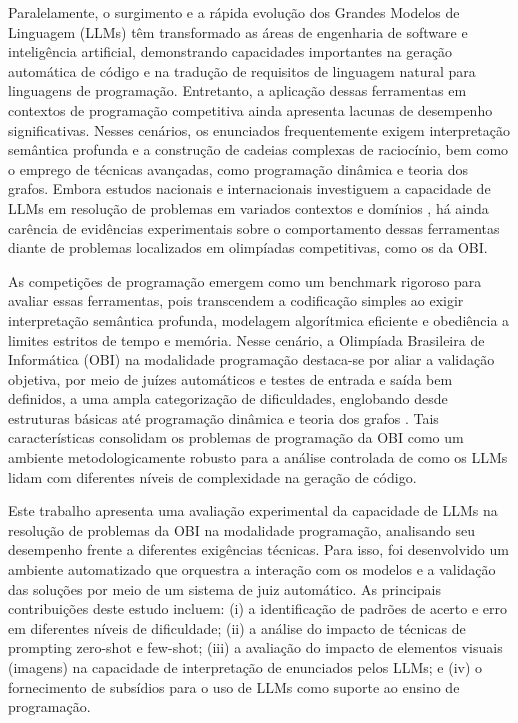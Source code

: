 \documentclass[12pt]{article}
\begin{document}
Paralelamente, o surgimento e a rápida evolução dos Grandes Modelos de Linguagem (LLMs) têm transformado as áreas de engenharia de software e inteligência artificial, demonstrando capacidades importantes na geração automática de código e na tradução de requisitos de linguagem natural para linguagens de programação. Entretanto, a aplicação dessas ferramentas em contextos de programação competitiva ainda apresenta lacunas de desempenho significativas. Nesses cenários, os enunciados frequentemente exigem interpretação semântica profunda e a construção de cadeias complexas de raciocínio, bem como o emprego de técnicas avançadas, como programação dinâmica e teoria dos grafos. Embora estudos nacionais e internacionais investiguem a capacidade de LLMs em resolução de problemas em variados contextos e domínios \cite{chen2021evaluating, mendonca2024evaluating, viegas2025assessing, huang2024competition, zheng2025livecodebench, li2024evaluating, almeida2023bluex}, há ainda carência de evidências experimentais sobre o comportamento dessas ferramentas diante de problemas localizados em olimpíadas competitivas, como os da OBI.

As competições de programação emergem como um benchmark rigoroso para avaliar essas ferramentas, pois transcendem a codificação simples ao exigir interpretação semântica profunda, modelagem algorítmica eficiente e obediência a limites estritos de tempo e memória. Nesse cenário, a Olimpíada Brasileira de Informática (OBI) na modalidade programação destaca-se por aliar a validação objetiva, por meio de juízes automáticos e testes de entrada e saída bem definidos, a uma ampla categorização de dificuldades, englobando desde estruturas básicas até programação dinâmica e teoria dos grafos \cite{obi2026}. Tais características consolidam os problemas de programação da OBI como um ambiente metodologicamente robusto para a análise controlada de como os LLMs lidam com diferentes níveis de complexidade na geração de código.

Este trabalho apresenta uma avaliação experimental da capacidade de LLMs na resolução de problemas da OBI na modalidade programação, analisando seu desempenho frente a diferentes exigências técnicas. Para isso, foi desenvolvido um ambiente automatizado que orquestra a interação com os modelos e a validação das soluções por meio de um sistema de juiz automático. As principais contribuições deste estudo incluem: (i) a identificação de padrões de acerto e erro em diferentes níveis de dificuldade; (ii) a análise do impacto de técnicas de prompting zero-shot e few-shot; (iii) a avaliação do impacto de elementos visuais (imagens) na capacidade de interpretação de enunciados pelos LLMs; e (iv) o fornecimento de subsídios para o uso de LLMs como suporte ao ensino de programação.
\end{document}
